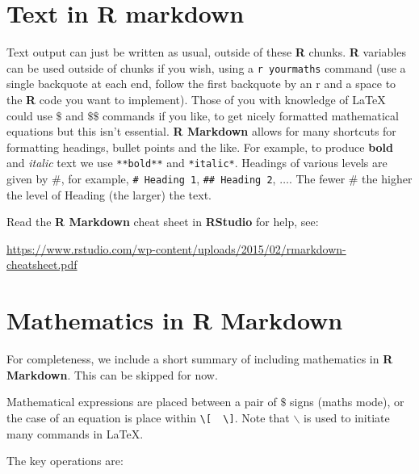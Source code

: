 \documentclass[
]{book}
\begin{document}
\hypertarget{Rmark_text}{%
\section{Text in R markdown}\label{Rmark_text}}

Text output can just be written as usual, outside of these \textbf{R} chunks. \textbf{R} variables can be used outside of chunks if you wish, using a \texttt{r\ yourmaths} command (use a single backquote at each end, follow the first backquote by an r and a space to the \textbf{R} code you want to implement). Those of you with knowledge of LaTeX could use \(\$\) and \(\$\$\) commands if you like, to get nicely formatted mathematical equations but this isn't essential. \textbf{R Markdown} allows for many shortcuts for formatting headings, bullet points and the like.
For example, to produce \textbf{bold} and \emph{italic} text we use \texttt{**bold**} and \texttt{*italic*}. Headings of various levels are given by \#, for example, \texttt{\#\ Heading\ 1}, \texttt{\#\#\ Heading\ 2}, \(\ldots\). The fewer \# the higher the level of Heading (the larger) the text.

Read the \textbf{R Markdown} cheat sheet in \textbf{RStudio} for help, see:

\url{https://www.rstudio.com/wp-content/uploads/2015/02/rmarkdown-cheatsheet.pdf}

\hypertarget{Rmark_maths}{%
\section{Mathematics in R Markdown}\label{Rmark_maths}}

For completeness, we include a short summary of including mathematics in \textbf{R Markdown}. This can be skipped for now.

Mathematical expressions are placed between a pair of \(\$\) signs (maths mode), or the case of an equation is place within \texttt{\textbackslash{}{[}\ \ \textbackslash{}{]}}. Note that \(\backslash\) is used to initiate many commands in LaTeX.

The key operations are:
\end{document}
